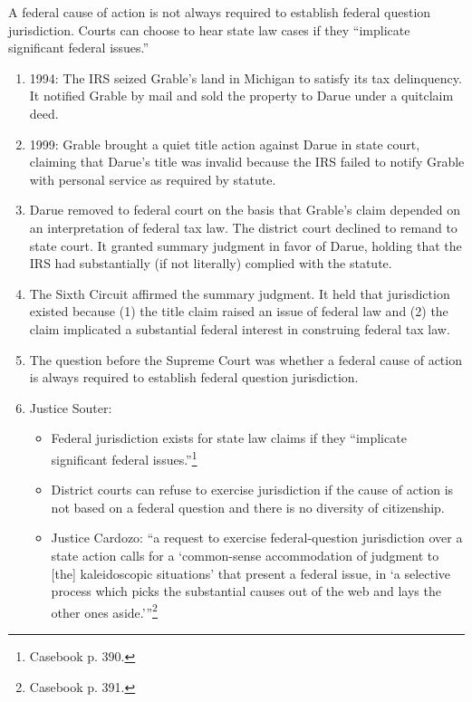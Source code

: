 A federal cause of action is not always required to establish federal question 
jurisdiction. Courts can choose to hear state law cases if they ``implicate 
significant federal issues.''

\begin{enumerate}
    \item 1994: The IRS seized Grable's land in Michigan to satisfy its tax 
    delinquency. It notified Grable by mail and sold the property to Darue 
    under a quitclaim deed.
    \item 1999: Grable brought a quiet title action against Darue in state 
    court, claiming that Darue's title was invalid because the IRS failed to 
    notify Grable with personal service as required by statute.
    \item Darue removed to federal court on the basis that Grable's claim 
    depended on an interpretation of federal tax law. The district court 
    declined to remand to state court. It granted summary judgment in favor of 
    Darue, holding that the IRS had substantially (if not literally) complied 
    with the statute.
    \item The Sixth Circuit affirmed the summary judgment. It held that 
    jurisdiction existed because (1) the title claim raised an issue of 
    federal law and (2) the claim implicated a substantial federal interest in 
    construing federal tax law.
    \item The question before the Supreme Court was whether a federal cause of 
    action is always required to establish federal question jurisdiction.
    \item Justice Souter:
    \begin{itemize}
        \item Federal jurisdiction exists for state law claims if they 
        ``implicate significant federal issues.''\footnote{Casebook p. 390.}
        \item District courts can refuse to exercise jurisdiction if the cause 
        of action is not based on a federal question and there is no diversity 
        of citizenship.
        \item Justice Cardozo: \enquote{a request to exercise federal-question 
        jurisdiction over a state action calls for a \enquote{common-sense 
        accommodation of judgment to [the] kaleidoscopic situations} that 
        present a federal issue, in \enquote{a selective process which picks 
        the substantial causes out of the web and lays the other ones 
        aside.}}\footnote{Casebook p. 391.}

\end{itemize}
\end{enumerate}
